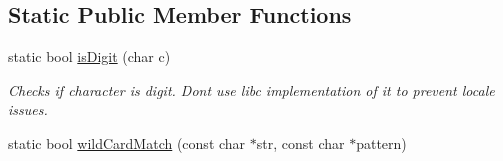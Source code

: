 \subsection*{Static Public Member Functions}
\begin{DoxyCompactItemize}
\item 
\hypertarget{classel_1_1base_1_1utils_1_1Str_a4caae91dfe0310d9f182bd9b7e99103c}{static bool \hyperlink{classel_1_1base_1_1utils_1_1Str_a4caae91dfe0310d9f182bd9b7e99103c}{is\-Digit} (char c)}\label{classel_1_1base_1_1utils_1_1Str_a4caae91dfe0310d9f182bd9b7e99103c}

\begin{DoxyCompactList}\small\item\em Checks if character is digit. Dont use libc implementation of it to prevent locale issues. \end{DoxyCompactList}\item 
\hypertarget{classel_1_1base_1_1utils_1_1Str_a95e007a25dfcbd77d4c573b0f73b3153}{static bool \hyperlink{classel_1_1base_1_1utils_1_1Str_a95e007a25dfcbd77d4c573b0f73b3153}{wild\-Card\-Match} (const char $\ast$str, const char $\ast$pattern)}\label{classel_1_1base_1_1utils_1_1Str_a95e007a25dfcbd77d4c573b0f73b3153}


\end{DoxyCompactItemize}
